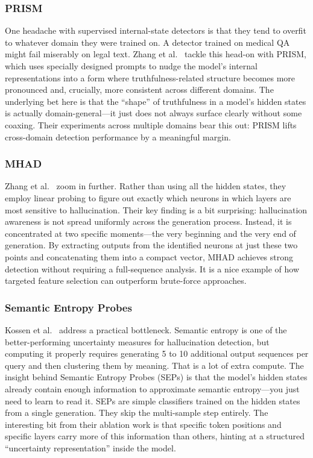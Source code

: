 \documentclass[journal]{IEEEtran}
\begin{document}
\subsubsection{PRISM}
One headache with supervised internal-state detectors is that they tend to overfit to whatever domain they were trained on. A detector trained on medical QA might fail miserably on legal text. Zhang et al.~\cite{prism} tackle this head-on with PRISM, which uses specially designed prompts to nudge the model's internal representations into a form where truthfulness-related structure becomes more pronounced and, crucially, more consistent across different domains. The underlying bet here is that the ``shape'' of truthfulness in a model's hidden states is actually domain-general---it just does not always surface clearly without some coaxing. Their experiments across multiple domains bear this out: PRISM lifts cross-domain detection performance by a meaningful margin.

\subsubsection{MHAD}
Zhang et al.~\cite{mhad} zoom in further. Rather than using all the hidden states, they employ linear probing to figure out exactly which neurons in which layers are most sensitive to hallucination. Their key finding is a bit surprising: hallucination awareness is not spread uniformly across the generation process. Instead, it is concentrated at two specific moments---the very beginning and the very end of generation. By extracting outputs from the identified neurons at just these two points and concatenating them into a compact vector, MHAD achieves strong detection without requiring a full-sequence analysis. It is a nice example of how targeted feature selection can outperform brute-force approaches.

\subsubsection{Semantic Entropy Probes}
Kossen et al.~\cite{sep} address a practical bottleneck. Semantic entropy is one of the better-performing uncertainty measures for hallucination detection, but computing it properly requires generating 5 to 10 additional output sequences per query and then clustering them by meaning. That is a lot of extra compute. The insight behind Semantic Entropy Probes (SEPs) is that the model's hidden states already contain enough information to approximate semantic entropy---you just need to learn to read it. SEPs are simple classifiers trained on the hidden states from a single generation. They skip the multi-sample step entirely. The interesting bit from their ablation work is that specific token positions and specific layers carry more of this information than others, hinting at a structured ``uncertainty representation'' inside the model.
\end{document}
